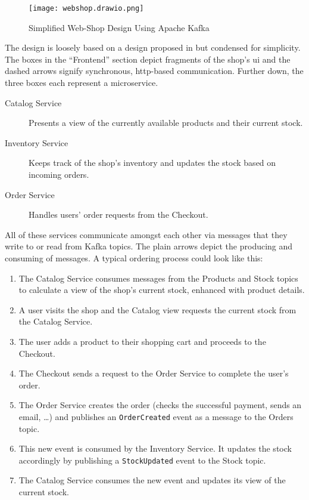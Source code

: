 \begin{figure}[H]
  \centering
  \texttt{[image: webshop.drawio.png]}
  \caption{Simplified Web-Shop Design Using Apache Kafka}\label{fig:webshop}
\end{figure}

The design is loosely based on a design proposed in \cite[p.~148]{stopford_designing_2018} but condensed for simplicity.
The boxes in the \enquote{Frontend} section depict fragments of the shop's \gls{ui} and the dashed arrows signify synchronous, \gls{http}-based communication.
Further down, the three boxes each represent a microservice.

\begin{description}
  \item[Catalog Service] Presents a view of the currently available products and their current stock.
  \item[Inventory Service] Keeps track of the shop's inventory and updates the stock based on incoming orders.
  \item[Order Service] Handles users' order requests from the Checkout.
\end{description}

All of these services communicate amongst each other via messages that they write to or read from Kafka topics.
The plain arrows depict the producing and consuming of messages.
A typical ordering process could look like this:

\begin{enumerate}
  \item The Catalog Service consumes messages from the Products and Stock topics to calculate a view of the shop's current stock, enhanced with product details.
  \item A user visits the shop and the Catalog view requests the current stock from the Catalog Service.
  \item The user adds a product to their shopping cart and proceeds to the Checkout.
  \item The Checkout sends a request to the Order Service to complete the user's order.
  \item The Order Service creates the order (checks the successful payment, sends an email, \ldots) and publishes an \texttt{OrderCreated} event as a message to the Orders topic.
  \item This new event is consumed by the Inventory Service. It updates the stock accordingly by publishing a \texttt{StockUpdated} event to the Stock topic.
  \item The Catalog Service consumes the new event and updates its view of the current stock.
\end{enumerate}

